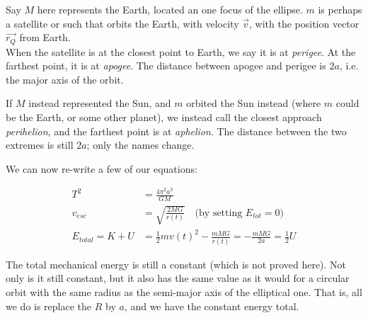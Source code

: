 \begin{figure}[H]
  \centering
{}
\end{figure}

Say $M$ here represents the Earth, located an one focus of the ellipse. $m$ is perhaps a satellite or such that orbits the Earth, with velocity $\vec{v}$, with the position vector $\vec{r_Q}$ from Earth.\\
When the satellite is at the closest point to Earth, we say it is at \emph{perigee}. At the farthest point, it is at \emph{apogee}. The distance between apogee and perigee is $2a$, i.e. the major axis of the orbit.

If $M$ instead represented the Sun, and $m$ orbited the Sun instead (where $m$ could be the Earth, or some other planet), we instead call the closest approach \emph{perihelion}, and the farthest point is at \emph{aphelion}. The distance between the two extremes is still $2a$; only the names change.

We can now re-write a few of our equations:

\begin{align}
T^2 &= \frac{4 \pi^2 a^3}{G M}\\
v_{esc} &= \sqrt{\frac{2 M G}{r(t)}} \quad \text{(by setting $E_{tot} = 0$)}\\
E_{total} = K + U &= \frac{1}{2} m v(t)^2 - \frac{m M G}{r(t)} = - \frac{m M G}{2a} = \frac{1}{2} U
\end{align}

The total mechanical energy is still a constant (which is not proved here). Not only is it still constant, but it also has the same value as it would for a circular orbit with the same radius as the semi-major axis of the elliptical one. That is, all we do is replace the $R$ by $a$, and we have the constant energy total.

